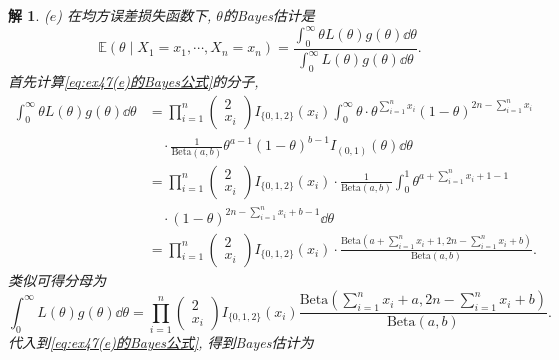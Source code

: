 \documentclass[a4paper,oneside,12pt]{ctexart}
\theoremstyle{plain}
\theoremstyle{nonumberplain}
\newtheorem{solution}{解}
\theoremstyle{nonumberplain}
\newcommand{\expect}{\mathbb{E}}
\newcommand{\Beta}{\mathrm{Beta}}
\begin{document}
\begin{solution}
        ($e$) 在均方误差损失函数下, $\theta$的Bayes估计是
        \begin{equation}
            \label{eq:ex47(e)的Bayes公式}
            \expect(\theta\mid X_1=x_1,\cdots,X_n=x_n)=\frac{\int_0^\infty \theta L(\theta)g(\theta)\dd{\theta}}{\int_0^\infty L(\theta)g(\theta)\dd{\theta}}.
        \end{equation}
        首先计算\cref{eq:ex47(e)的Bayes公式}的分子, 
        \begin{align*}
            \int_0^\infty \theta L(\theta)g(\theta)\dd{\theta}&=\prod_{i=1}^n\begin{pmatrix}
                2\\
                x_i
            \end{pmatrix}I_{\{0,1,2\}}(x_i)\int_0^\infty \theta\cdot\theta^{\sum_{i=1}^nx_i}(1-\theta)^{2n-\sum_{i=1}^nx_i}\\
            &\quad\cdot \frac{1}{\Beta(a,b)}\theta^{a-1}(1-\theta)^{b-1}I_{(0,1)}(\theta)\dd{\theta}\\
            &=\prod_{i=1}^n\begin{pmatrix}
                2\\
                x_i
            \end{pmatrix}I_{\{0,1,2\}}(x_i)\cdot\frac{1}{\Beta(a,b)}\int_0^1\theta^{a+\sum_{i=1}^nx_i+1-1}\\
            &\quad\cdot(1-\theta)^{2n-\sum_{i=1}^nx_i+b-1}\dd{\theta}\\
            &=\prod_{i=1}^n\begin{pmatrix}
                2\\
                x_i
            \end{pmatrix}I_{\{0,1,2\}}(x_i)\cdot\frac{\Beta\left(a+\sum_{i=1}^nx_i+1,2n-\sum_{i=1}^nx_i+b\right)}{\Beta(a,b)}.
        \end{align*}
        类似可得分母为 
        \begin{equation*}
            \int_0^\infty L(\theta)g(\theta)\dd{\theta}=\prod_{i=1}^n\begin{pmatrix}
                2\\
                x_i
            \end{pmatrix}I_{\{0,1,2\}}(x_i)\frac{\Beta\left(\sum_{i=1}^nx_i+a,2n-\sum_{i=1}^nx_i+b\right)}{\Beta(a,b)}.
        \end{equation*}
        代入到\cref{eq:ex47(e)的Bayes公式}, 得到Bayes估计为
        \begin{equation}
            \label{eq:ex47(e)Bayes估计}

\end{equation}
\end{solution}
\end{document}
